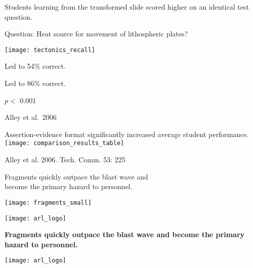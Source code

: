 \documentclass[t]{beamer}
\begin{document}
\begin{frame}[t]{Students learning from the transformed slide scored higher on an identical test question.}

\vspace{-\baselineskip}
\hangpara Question: Heat source for movement of lithospheric plates?

\noindent \texttt{[image: tectonics\_recall]}

\vspace{-\baselineskip}
\begin{multicols}{2}
\centering

Led to 54\% correct. 

\columnbreak

Led to 86\% correct.
\end{multicols}

\hangpara $p < $ 0.001


\tinyfill Alley et al.\ 2006

\end{frame}

%

\begin{frame}[t]{Assertion-evidence format significantly increased average student performance.}
\centering
\texttt{[image: comparison\_results\_table]}


\tinyfill Alley et al. 2006. Tech. Comm. 53: 225
\end{frame}

\begin{frame}[t]{Fragments quickly outpace the blast wave and\\become the primary hazard to personnel.}

\centering

\texttt{[image: fragments\_small]}

\vfilll

\hfill \texttt{[image: arl\_logo]}
\end{frame}

%

%
{
\begin{frame}[t]{\bfseries Fragments quickly outpace the blast wave and become the primary hazard to personnel.}

\vfilll

\texttt{[image: arl\_logo]}

\end{frame}
}
\end{document}
